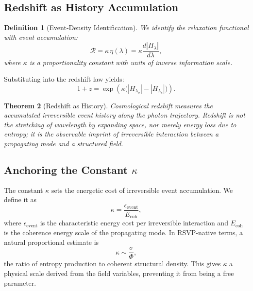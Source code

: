 \documentclass[12pt,a4paper]{article}
\newtheorem{theorem}{Theorem}[section]
\newtheorem{definition}[theorem]{Definition}
\theoremstyle{remark}
\newcommand{\Rcal}{\mathcal{R}}
\begin{document}
\subsection{Redshift as History Accumulation}

\begin{definition}[Event-Density Identification]
We identify the relaxation functional with event accumulation:
\begin{equation}
\boxed{\Rcal = \kappa\,\eta(\lambda) = \kappa\frac{d|H_\lambda|}{d\lambda},}
\label{eq:R_spherepop}
\end{equation}
where $\kappa$ is a proportionality constant with units of inverse information scale.
\end{definition}

Substituting into the redshift law yields:
\begin{equation}
\boxed{1 + z = \exp\!\left(\kappa\bigl(|H_{\lambda_o}| - |H_{\lambda_e}|\bigr)\right).}
\label{eq:z_spherepop}
\end{equation}

\begin{theorem}[Redshift as History]
Cosmological redshift measures the accumulated irreversible event history along the photon trajectory. Redshift is not the stretching of wavelength by expanding space, nor merely energy loss due to entropy; it is the observable imprint of irreversible interaction between a propagating mode and a structured field.
\end{theorem}

\subsection{Anchoring the Constant $\kappa$}

The constant $\kappa$ sets the energetic cost of irreversible event accumulation. We define it as
\begin{equation}
\kappa = \frac{\epsilon_{\mathrm{event}}}{E_{\mathrm{coh}}},
\end{equation}
where $\epsilon_{\mathrm{event}}$ is the characteristic energy cost per irreversible interaction and $E_{\mathrm{coh}}$ is the coherence energy scale of the propagating mode. In RSVP-native terms, a natural proportional estimate is
\begin{equation}
\kappa \sim \frac{\sigma}{\Phi},
\end{equation}
the ratio of entropy production to coherent structural density. This gives $\kappa$ a physical scale derived from the field variables, preventing it from being a free parameter.
\end{document}
